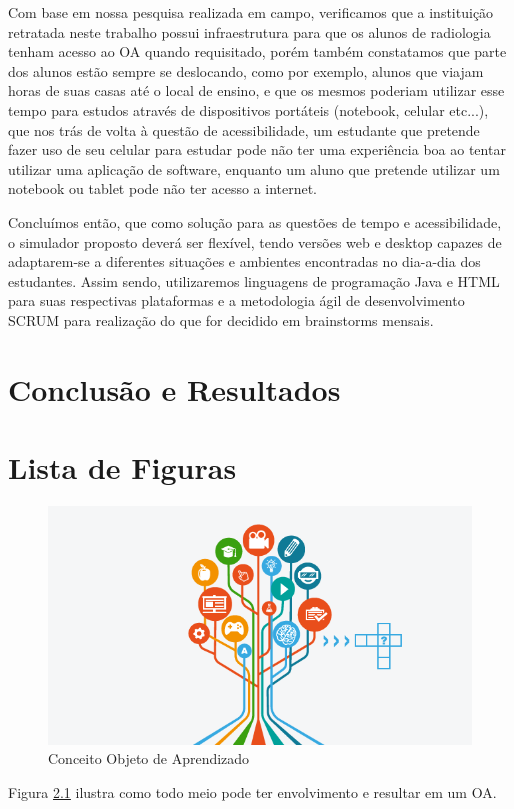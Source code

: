 \documentclass[12pt,openright,oneside,a4paper,english,french,spanish,brazil]{unifil}
\begin{document}
Com base em nossa pesquisa realizada em campo, verificamos que a instituição retratada neste trabalho possui infraestrutura para que os alunos de radiologia tenham acesso ao OA quando requisitado, porém também constatamos que parte dos alunos estão sempre se deslocando, como por exemplo, alunos que viajam horas de suas casas até o local de ensino, e que os mesmos poderiam utilizar esse tempo para estudos através de dispositivos portáteis (notebook, celular etc...), que nos trás de volta à questão de acessibilidade, um estudante que pretende fazer uso de seu celular para estudar pode não ter uma experiência boa ao tentar utilizar uma aplicação de software, enquanto um aluno que pretende utilizar um notebook ou tablet pode não ter acesso a internet.

Concluímos então, que como solução para as questões de tempo e acessibilidade, o simulador proposto deverá ser flexível, tendo versões web e desktop capazes de adaptarem-se a diferentes situações e ambientes encontradas no dia-a-dia dos estudantes. Assim sendo, utilizaremos linguagens de programação Java e HTML para suas respectivas plataformas e a metodologia ágil de desenvolvimento SCRUM para realização do que for decidido em brainstorms mensais.


\chapter {Conclusão e Resultados}

\chapter{Lista de Figuras}

\begin{figure}[htb]
	\centering
	\includegraphics[scale=0.5]{images/arvore.png}
	\caption{Conceito Objeto de Aprendizado}
	\label{img:arvore}
\end{figure}
Figura \ref{img:arvore} ilustra como todo meio pode ter envolvimento e resultar em um OA.
\end{document}
